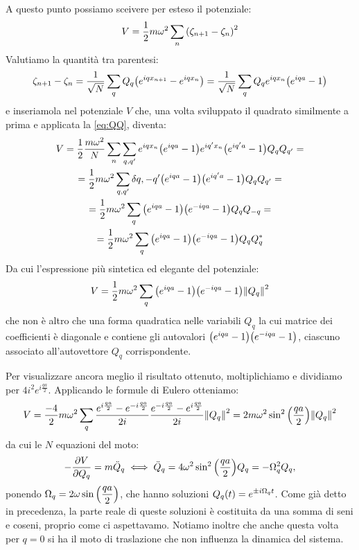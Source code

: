     \par A questo punto possiamo sceivere per esteso il potenziale: $$V=\frac{1}{2}m\omega^2\sum_n\qty(\zeta_{n+1}-\zeta_n)^2$$ Valutiamo la quantit\`a tra parentesi: $$\zeta_{n+1}-\zeta_n=\frac{1}{\sqrt{N}}\sum_qQ_q\qty(e^{iqx_{n+1}}-e^{iqx_n})=\frac{1}{\sqrt{N}}\sum_qQ_qe^{iqx_n}\qty(e^{iqa}-1)$$ e inseriamola nel potenziale $V$ che, una volta sviluppato il quadrato similmente a prima e applicata la \eqref{eq:QQ}, diventa:
    \begin{multline*}
        V=\frac{1}{2}\frac{m\omega^2}{N}\sum_n\sum_{q,q'}e^{iqx_n}\qty(e^{iqa}-1)e^{iq'x_n}\bigl(e^{iq'a}-1\bigr)Q_qQ_{q'}=\\=\frac{1}{2}m\omega^2\sum_{q,q'}\delta{q,-q'}\qty(e^{iqa}-1)\bigl(e^{iq'a}-1\bigr)Q_qQ_{q'}=\\=\frac{1}{2}m\omega^2\sum_q\qty(e^{iqa}-1)\qty(e^{-iqa}-1)Q_qQ_{-q}=\\=\frac{1}{2}m\omega^2\sum_q\qty(e^{iqa}-1)\qty(e^{-iqa}-1)Q_qQ_q^*
    \end{multline*}
    Da cui l'espressione pi\`u sintetica ed elegante del potenziale:
    \begin{equation}
        V=\frac{1}{2}m\omega^2\sum_q\qty(e^{iqa}-1)\qty(e^{-iqa}-1)\norm{Q_q}^2
    \end{equation}
    che non \`e altro che una forma quadratica nelle variabili $Q_q$ la cui matrice dei coefficienti \`e diagonale e contiene gli autovalori $\qty(e^{iqa}-1)\qty(e^{-iqa}-1)$, ciascuno associato all'autovettore $Q_q$ corrispondente. \par Per visualizzare ancora meglio il risultato ottenuto, moltiplichiamo e dividiamo per $\displaystyle 4i^2e^{i\frac{qa}{2}}$. Applicando le formule di Eulero otteniamo: $$V=\frac{-4}{2}m\omega^2\sum_q\frac{e^{i\frac{qa}{2}}-e^{-i\frac{qa}{2}}}{2i}\frac{e^{-i\frac{qa}{2}}-e^{i\frac{qa}{2}}}{2i}\norm{Q_q}^2=2m\omega^2\sin^2\qty(\frac{qa}{2})\norm{Q_q}^2$$ da cui le $N$ equazioni del moto: $$-\pdv{V}{Q_q}=m\ddot{Q}_q \iff \ddot{Q}_q=4\omega^2\sin^2\qty(\frac{qa}{2})Q_q=-\Omega_q^2Q_q,$$ ponendo $\displaystyle\Omega_q=2\omega\sin\qty(\frac{qa}{2})$, che hanno soluzioni $\displaystyle Q_q\qty(t)=e^{\pm i\Omega_qt}$. Come gi\`a detto in precedenza, la parte reale di queste soluzioni \`e costituita da una somma di seni e coseni, proprio come ci aspettavamo. Notiamo inoltre che anche questa volta per $q=0$ si ha il moto di traslazione che non influenza la dinamica del sistema.